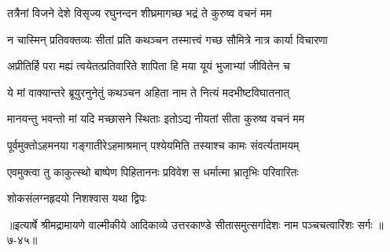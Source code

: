 \twolineshloka
{तत्रैनां विजने देशे विसृज्य रघुनन्दन}
{शीघ्रमागच्छ भद्रं ते कुरुष्व वचनं मम} %

\twolineshloka
{न चास्मिन् प्रतिवक्तव्यः सीतां प्रति कथञ्चन}
{तस्मात्त्वं गच्छ सौमित्रे नात्र कार्या विचारणा} %

\twolineshloka
{अप्रीतिर्हि परा मह्यं त्वयेतत्प्रतिवारिते}
{शापिता हि मया यूयं भुजाभ्यां जीवितेन च} %

\twolineshloka
{ये मां वाक्यान्तरे ब्रूयुरनुनेतुं कथञ्चन}
{अहिता नाम ते नित्यं मदभीष्टविघातनात्} %

\twolineshloka
{मानयन्तु भवन्तो मां यदि मच्छासने स्थिताः}
{इतोऽद्य नीयतां सीता कुरुष्व वचनं मम} %

\twolineshloka
{पूर्वमुक्तोऽहमनया गङ्गातीरेऽहमाश्रमान्}
{पश्येयमिति तस्याश्च कामः संवर्त्यतामयम्} %

\twolineshloka
{एवमुक्त्वा तु काकुत्स्थो बाष्पेण पिहिताननः}
{प्रविवेश स धर्मात्मा भ्रातृभिः परिवारितः} %

\onelineshloka
{शोकसंलग्नहृदयो निशश्वास यथा द्विपः} %


॥इत्यार्षे श्रीमद्रामायणे वाल्मीकीये आदिकाव्ये उत्तरकाण्डे सीतासमुत्सर्गादेशः नाम पञ्चचत्वारिंशः सर्गः ॥७-४५॥
